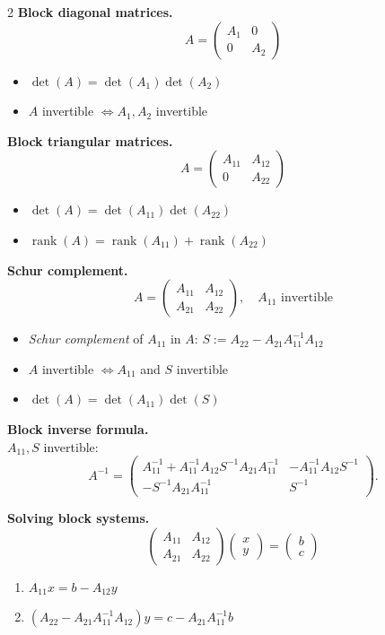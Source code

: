 \documentclass[fleqn]{article}
\newcommand{\subhead}[1]{\medskip\noindent\textbf{#1}}
\begin{document}
\begin{multicols}{2}
\subhead{Block diagonal matrices.}
\[
A=
\begin{pmatrix}
A_1 & 0\\
0 & A_2
\end{pmatrix}
\]
\begin{itemize}
\item $\det(A) = \det(A_1)\det(A_2)$
\item $A$ invertible $\iff A_1, A_2$ invertible
\end{itemize}

\subhead{Block triangular matrices.}
\[
A=
\begin{pmatrix}
A_{11} & A_{12}\\
0 & A_{22}
\end{pmatrix}
\]
\begin{itemize}
\item $\det(A) = \det(A_{11})\det(A_{22})$
\item $\operatorname{rank}(A) = \operatorname{rank}(A_{11})+\operatorname{rank}(A_{22})$
\end{itemize}

\subhead{Schur complement.}
\[
A=
\begin{pmatrix}
A_{11} & A_{12}\\
A_{21} & A_{22}
\end{pmatrix},
\quad A_{11} \text{ invertible}
\]
\begin{itemize}
\item \emph{Schur complement} of $A_{11}$ in $A$: $S := A_{22} - A_{21}A_{11}^{-1}A_{12}$
\item $A$ invertible $\iff A_{11}$ and $S$ invertible
\item $\det(A)=\det(A_{11})\det(S)$
\end{itemize}

\subhead{Block inverse formula.}\\
$A_{11}, S$ invertible:
\[
A^{-1} =
\begin{pmatrix}
A_{11}^{-1} + A_{11}^{-1}A_{12}S^{-1}A_{21}A_{11}^{-1}
&
- A_{11}^{-1}A_{12}S^{-1}
\\[6pt]
- S^{-1}A_{21}A_{11}^{-1}
&
S^{-1}
\end{pmatrix}.
\]

\subhead{Solving block systems.}
\[
\begin{pmatrix}
A_{11} & A_{12}\\
A_{21} & A_{22}
\end{pmatrix}
\begin{pmatrix}
x\\
y
\end{pmatrix}
=
\begin{pmatrix}
b\\
c
\end{pmatrix}
\]
\begin{enumerate}
\item $A_{11}x = b - A_{12}y$
\item $(A_{22}-A_{21}A_{11}^{-1}A_{12})y = c - A_{21}A_{11}^{-1}b$
\end{enumerate}


\end{multicols}
\end{document}
